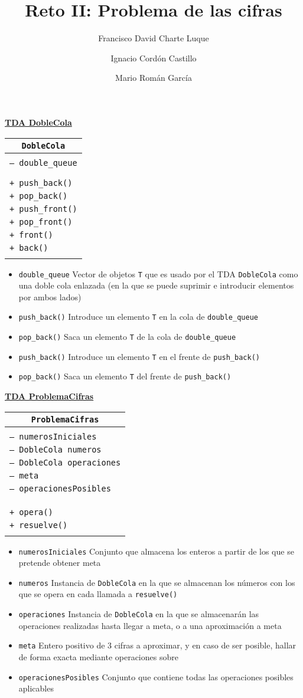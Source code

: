 \documentclass[a4paper,10pt]{scrartcl}
\title{Reto II: Problema de las cifras}
\author{Francisco David Charte Luque \and 
        Ignacio Cordón Castillo \and
        Mario Román García}
\date{}
\newcommand{\objeto}[4]{\underline{\textbf{TDA #1}}
            \begin{center}\begin{tabular}{|p{7cm}|}
                 \hline
                 \multicolumn{1}{|c|}{\texttt{#1}}\\
                 \hline
                  \\#2\\\\
                 \hline
                 \\#3\\\\
                 \hline
            \end{tabular}\end{center}
            \begin{itemize}
            #4
            \end{itemize}
               }
\def\C++#1{\texttt{#1}}
\def\T_{\texttt{T}}
\begin{document}
\maketitle

    \objeto{DobleCola}{\C++{-- double\_queue}}
                {\C++{+ push\_back()}\\
                 \C++{+ pop\_back()}\\
                 \C++{+ push\_front()}\\
                 \C++{+ pop\_front()}\\
                 \C++{+ front()}\\
                 \C++{+ back()}}{
 \item \C++{double\_queue} Vector de objetos \T_ que es usado por
  el TDA \C++{DobleCola} como una doble cola enlazada (en la que
  se puede suprimir e introducir elementos por ambos lados)
 \item \C++{push\_back()} Introduce un elemento \T_ en la cola de
  \C++{double\_queue}
 \item \C++{pop\_back()} Saca un elemento \T_ de la cola de 
  \C++{double\_queue}
 \item \C++{push\_back()} Introduce un elemento \T_ en el frente
  de \C++{push\_back()}
 \item \C++{pop\_back()} Saca un elemento \T_ del frente de 
  \C++{push\_back()}}  
  
 \objeto{ProblemaCifras}{\C++{-- numerosIniciales}\\
                        \C++{-- DobleCola numeros}\\
                        \C++{-- DobleCola operaciones}\\
                        \C++{-- meta}\\
                        \C++{-- operacionesPosibles}\\
                        }
                        {\C++{+ opera()}\\
                        \C++{+ resuelve()}}{
  \item \C++{numerosIniciales} Conjunto que almacena los enteros
   a partir de los que se pretende obtener meta
  \item \C++{numeros} Instancia de \C++{DobleCola} en la que se
   almacenan los números con los que se opera en cada llamada
   a \C++{resuelve()}
  \item \C++{operaciones} Instancia de \C++{DobleCola} en la que
   se almacenarán las operaciones realizadas hasta llegar a meta,
   o a una aproximación a meta
  \item \C++{meta} Entero positivo de 3 cifras a aproximar, y en
   caso de ser posible, hallar de forma exacta mediante operaciones sobre
  \item \C++{operacionesPosibles} Conjunto que contiene todas las
   operaciones posibles aplicables}       
   
\end{document}
